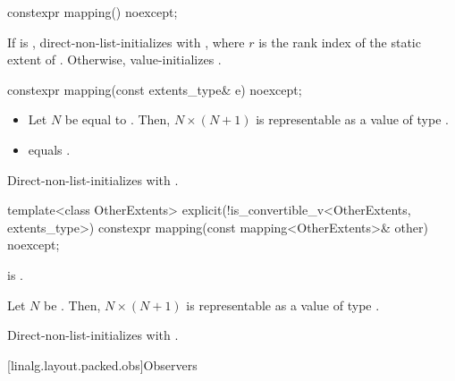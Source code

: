 %
\begin{itemdecl}
constexpr mapping() noexcept;
\end{itemdecl}

\begin{itemdescr}
\pnum
\effects
If  is ,
direct-non-list-initializes  with
,
where $r$ is the rank index of the static extent of .
Otherwise, value-initializes .
\end{itemdescr}

%
\begin{itemdecl}
constexpr mapping(const extents_type& e) noexcept;
\end{itemdecl}

\begin{itemdescr}
\pnum
\expects
\begin{itemize}
\item
Let $N$ be equal to .
Then, $N \times (N+1)$ is representable as
a value of type .
\item
{} equals .
\end{itemize}

\pnum
\effects
Direct-non-list-initializes  with .
\end{itemdescr}

%
\begin{itemdecl}
template<class OtherExtents>
  explicit(!is_convertible_v<OtherExtents, extents_type>)
    constexpr mapping(const mapping<OtherExtents>& other) noexcept;
\end{itemdecl}

\begin{itemdescr}
\pnum
\constraints
{} is .

\pnum
\expects
Let $N$ be .
Then, $N \times (N+1)$ is representable as
a value of type .

\pnum
\effects
Direct-non-list-initializes  with .
\end{itemdescr}

[linalg.layout.packed.obs]{Observers}

